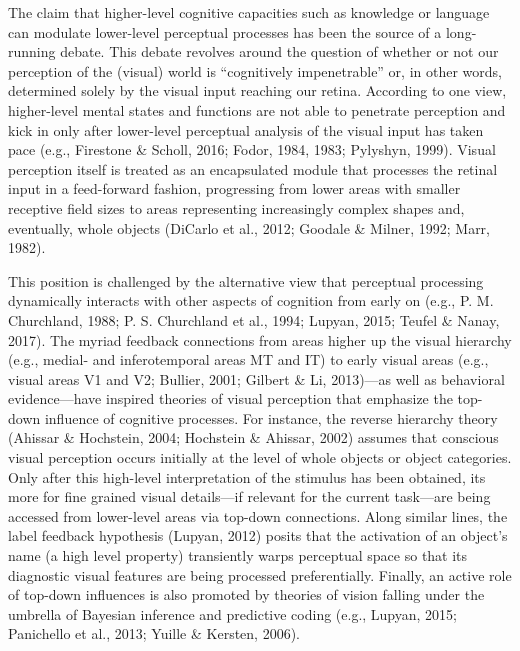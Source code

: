 \documentclass[
  english,
  doc,12pt,twoside,floatsintext]{apa7}
\begin{document}
The claim that higher-level cognitive capacities such as knowledge or language can modulate lower-level perceptual processes has been the source of a long-running debate. This debate revolves around the question of whether or not our perception of the (visual) world is ``cognitively impenetrable'' or, in other words, determined solely by the visual input reaching our retina. According to one view, higher-level mental states and functions are not able to penetrate perception and kick in only after lower-level perceptual analysis of the visual input has taken pace (e.g., Firestone \& Scholl, 2016; Fodor, 1984, 1983; Pylyshyn, 1999). Visual perception itself is treated as an encapsulated module that processes the retinal input in a feed-forward fashion, progressing from lower areas with smaller receptive field sizes to areas representing increasingly complex shapes and, eventually, whole objects (DiCarlo et al., 2012; Goodale \& Milner, 1992; Marr, 1982).

This position is challenged by the alternative view that perceptual processing dynamically interacts with other aspects of cognition from early on (e.g., P. M. Churchland, 1988; P. S. Churchland et al., 1994; Lupyan, 2015; Teufel \& Nanay, 2017). The myriad feedback connections from areas higher up the visual hierarchy (e.g., medial- and inferotemporal areas MT and IT) to early visual areas (e.g., visual areas V1 and V2; Bullier, 2001; Gilbert \& Li, 2013)---as well as behavioral evidence---have inspired theories of visual perception that emphasize the top-down influence of cognitive processes. For instance, the reverse hierarchy theory (Ahissar \& Hochstein, 2004; Hochstein \& Ahissar, 2002) assumes that conscious visual perception occurs initially at the level of whole objects or object categories. Only after this high-level interpretation of the stimulus has been obtained, its more for fine grained visual details---if relevant for the current task---are being accessed from lower-level areas via top-down connections. Along similar lines, the label feedback hypothesis (Lupyan, 2012) posits that the activation of an object's name (a high level property) transiently warps perceptual space so that its diagnostic visual features are being processed preferentially. Finally, an active role of top-down influences is also promoted by theories of vision falling under the umbrella of Bayesian inference and predictive coding (e.g., Lupyan, 2015; Panichello et al., 2013; Yuille \& Kersten, 2006).
\end{document}
